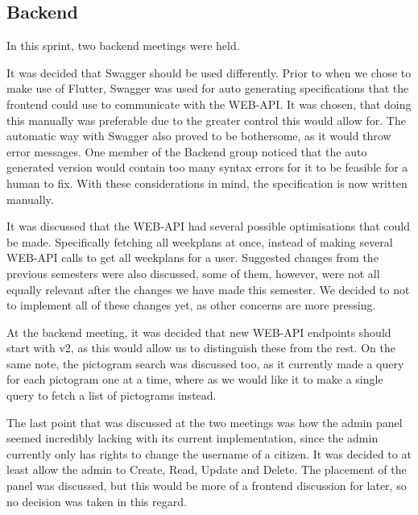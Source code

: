 \subsection{Backend}
In this sprint, two backend meetings were held.

It was decided that Swagger should be used differently.
Prior to when we chose to make use of Flutter, Swagger was used for auto generating specifications that the frontend could use to communicate with the WEB-API.
It was chosen, that doing this manually was preferable due to the greater control this would allow for.
The automatic way with Swagger also proved to be bothersome, as it would throw error messages.
One member of the Backend group noticed that the auto generated version would contain too many syntax errors for it to be feasible for a human to fix.
With these considerations in mind, the specification is now written manually.

It was discussed that the WEB-API had several possible optimisations that could be made.
Specifically fetching all weekplans at once, instead of making several WEB-API calls to get all weekplans for a user.
Suggested changes from the previous semesters were also discussed, some of them, however, were not all equally relevant after the changes we have made this semester.
We decided to not to implement all of these changes yet, as other concerns are more pressing.

At the backend meeting, it was decided that new WEB-API endpoints should start with v2, as this would allow us to distinguish these from the rest.
On the same note, the pictogram search was discussed too, as it currently made a query for each pictogram one at a time, where as we would like it to make a single query to fetch a list of pictograms instead.

The last point that was discussed at the two meetings was how the admin panel seemed incredibly lacking with its current implementation, since the admin currently only has rights to change the username of a citizen. 
It was decided to at least allow the admin to Create, Read, Update and Delete. 
The placement of the panel was discussed, but this would be more of a frontend discussion for later, so no decision was taken in this regard.
